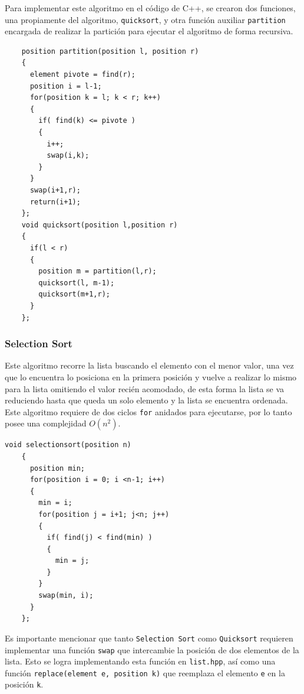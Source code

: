 Para implementar este algoritmo en el código de C++, se crearon dos funciones, una propiamente del algoritmo, \texttt{quicksort}, y otra función auxiliar \texttt{partition} encargada de realizar la partición para ejecutar el algoritmo de forma recursiva.

\begin{verbatim}
    position partition(position l, position r)
    {
      element pivote = find(r);
      position i = l-1;
      for(position k = l; k < r; k++)
      {
        if( find(k) <= pivote )
        {
          i++;
          swap(i,k);
        }
      }
      swap(i+1,r);
      return(i+1);
    };
    void quicksort(position l,position r)
    {
      if(l < r)
      {
        position m = partition(l,r);
        quicksort(l, m-1);
        quicksort(m+1,r);
      }
    };
\end{verbatim}

\subsubsection{Selection Sort}

Este algoritmo recorre la lista buscando el elemento con el menor valor, una vez que lo encuentra lo posiciona en la primera posición y vuelve a realizar lo mismo para la lista omitiendo el valor recién acomodado, de esta forma la lista se va reduciendo hasta que queda un solo elemento y la lista se encuentra ordenada. Este algoritmo requiere de dos ciclos \texttt{for} anidados para ejecutarse, por lo tanto posee una complejidad $O(n^2)$. 
\begin{verbatim}
void selectionsort(position n)
    {
      position min;
      for(position i = 0; i <n-1; i++)
      {
        min = i;
        for(position j = i+1; j<n; j++)
        {
          if( find(j) < find(min) )
          {
            min = j;
          }
        }
        swap(min, i);
      }
    };
\end{verbatim}

Es importante mencionar que tanto \texttt{Selection Sort} como \texttt{Quicksort} requieren implementar una función \texttt{swap} que intercambie la posición de dos elementos de la lista. Esto se logra implementando esta función en \texttt{list.hpp}, así como una función \texttt{replace(element e, position k)} que reemplaza el elemento \texttt{e} en la posición \texttt{k}.

